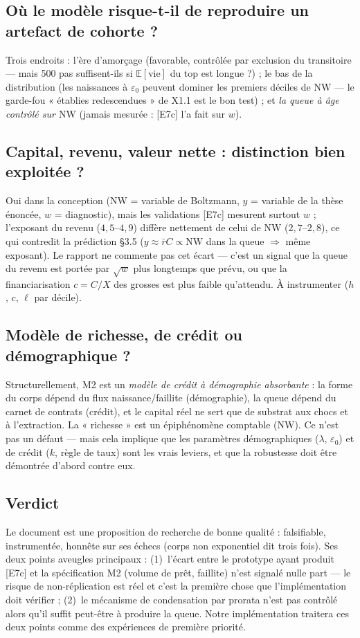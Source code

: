 \documentclass[11pt,a4paper]{article}
\newcommand{\NW}{\mathrm{NW}}
\newcommand{\E}{\mathbb{E}}
\begin{document}
\subsection{Où le modèle risque-t-il de reproduire un artefact de cohorte ?}
Trois endroits : l'ère d'amorçage (favorable, contrôlée par exclusion du
transitoire — mais 500 pas suffisent-ils si $\E[\text{vie}]$ du top est
longue ?) ; le bas de la distribution (les naissances à $\varepsilon_0$
peuvent dominer les premiers déciles de $\NW$ — le garde-fou « établies
redescendues » de X1.1 est le bon test) ; et \emph{la queue à âge contrôlé
sur $\NW$} (jamais mesurée : [E7c] l'a fait sur $w$).

\subsection{Capital, revenu, valeur nette : distinction bien exploitée ?}
Oui dans la conception (NW = variable de Boltzmann, $y$ = variable de la
thèse énoncée, $w$ = diagnostic), mais les validations [E7c] mesurent
surtout $w$ ; l'exposant du revenu ($4{,}5$--$4{,}9$) diffère nettement de
celui de $\NW$ ($2{,}7$--$2{,}8$), ce qui contredit la prédiction §3.5
($y \approx \bar r C \propto \NW$ dans la queue $\Rightarrow$ même exposant).
Le rapport ne commente pas cet écart — c'est un signal que la queue du
revenu est portée par $\sqrt{w}$ plus longtemps que prévu, ou que la
financiarisation $c = C/X$ des grosses est plus faible qu'attendu. À
instrumenter ($h$, $c$, $\ell$ par décile).

\subsection{Modèle de richesse, de crédit ou démographique ?}
Structurellement, M2 est un \emph{modèle de crédit à démographie
absorbante} : la forme du corps dépend du flux naissance/faillite
(démographie), la queue dépend du carnet de contrats (crédit), et le
capital réel ne sert que de substrat aux chocs et à l'extraction. La
« richesse » est un épiphénomène comptable ($\NW$). Ce n'est pas un défaut —
mais cela implique que les paramètres démographiques ($\lambda$,
$\varepsilon_0$) et de crédit ($k$, règle de taux) sont les vrais leviers,
et que la robustesse doit être démontrée d'abord contre eux.

\subsection{Verdict}
Le document est une proposition de recherche de bonne qualité : falsifiable,
instrumentée, honnête sur ses échecs (corps non exponentiel dit trois fois).
Ses deux points aveugles principaux : (1)~l'écart entre le prototype ayant
produit [E7c] et la spécification M2 (volume de prêt, faillite) n'est
signalé nulle part — le risque de non-réplication est réel et c'est la
première chose que l'implémentation doit vérifier ; (2)~le mécanisme de
condensation par prorata n'est pas contrôlé alors qu'il suffit peut-être à
produire la queue. Notre implémentation traitera ces deux points comme des
expériences de première priorité.
\end{document}
